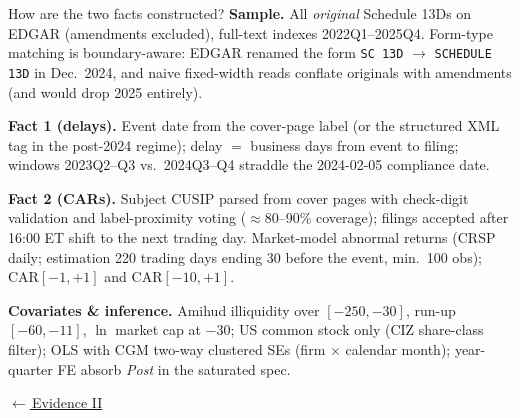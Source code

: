 \documentclass[aspectratio=169,10pt]{beamer}
\newcommand{\1}{\mathbf{1}}
\newcommand{\returnlink}[2]{%
  \par\vspace{0.2em}\hfill{\scriptsize\hyperlink{#1}{\textcolor{brightblue}{$\leftarrow$\,#2}}}%
}
\begin{document}
\begin{frame}{How are the two facts constructed?}
\hypertarget{backup:fact_methods}{}
\footnotesize
\textbf{Sample.} All \emph{original} Schedule 13Ds on EDGAR (amendments
excluded), full-text indexes 2022Q1--2025Q4. Form-type matching is
boundary-aware: EDGAR renamed the form \texttt{SC 13D} $\to$
\texttt{SCHEDULE 13D} in Dec.\ 2024, and naive fixed-width reads conflate
originals with amendments (and would drop 2025 entirely).

\vspace{0.25em}
\textbf{Fact 1 (delays).} Event date from the cover-page label (or the
structured XML tag in the post-2024 regime); delay $=$ business days from
event to filing; windows 2023Q2--Q3 vs.\ 2024Q3--Q4 straddle the 2024-02-05
compliance date.

\vspace{0.25em}
\textbf{Fact 2 (CARs).} Subject CUSIP parsed from cover pages with
check-digit validation and label-proximity voting ($\approx$80--90\%
coverage); filings accepted after 16:00 ET shift to the next trading day.
Market-model abnormal returns (CRSP daily; estimation 220 trading days
ending 30 before the event, min.\ 100 obs); $\mathrm{CAR}[-1,+1]$ and
$\mathrm{CAR}[-10,+1]$.

\vspace{0.25em}
\textbf{Covariates \& inference.} Amihud illiquidity over $[-250,-30]$,
run-up $[-60,-11]$, $\ln$ market cap at $-30$; US common stock only
(CIZ share-class filter); OLS with CGM two-way clustered SEs (firm $\times$
calendar month); year-quarter FE absorb \emph{Post} in the saturated spec.

\returnlink{main:fact2}{Evidence II}
\end{frame}
\end{document}
